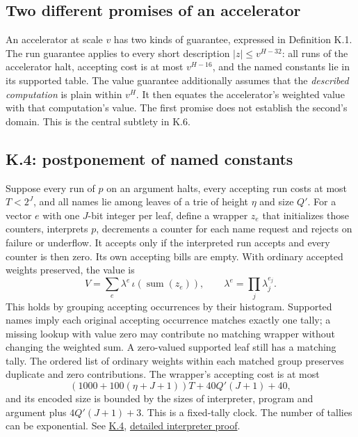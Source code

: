 \documentclass[11pt,letterpaper]{article}
\theoremstyle{definition}\newtheorem{definition}[theorem]{Definition}\newtheorem{example}[theorem]{Example}
\theoremstyle{remark}\newtheorem{remark}[theorem]{Remark}
\newcommand{\pub}[3]{\href{https://github.com/anthropics/formal-math/blob/11b6c7e3c927df2658f513b6b68ea7f8929c62c5/vp-vnp/#1\#L#2}{#3}}
\newcommand{\aud}[2]{\href{https://github.com/nousentllc/VP-VNP-Review/blob/567303d0bcf4f9d54390437b137752446e58ccd6/#1}{#2}}
\begin{document}
\subsection{Two different promises of an accelerator}
An accelerator at scale $v$ has two kinds of guarantee, expressed in Definition K.1. The run guarantee applies to every short description $|z|\le v^{H-32}$: all runs of the accelerator halt, accepting cost is at most $v^{H-16}$, and the named constants lie in its supported table. The value guarantee additionally assumes that the \emph{described computation} is plain within $v^H$. It then equates the accelerator's weighted value with that computation's value. The first promise does not establish the second's domain. This is the central subtlety in K.6.

\subsection{K.4: postponement of named constants}\label{sec:postpone}
Suppose every run of $p$ on an argument halts, every accepting run costs at most $T<2^J$, and all names lie among leaves of a trie of height $\eta$ and size $Q'$. For a vector $e$ with one $J$-bit integer per leaf, define a wrapper $z_e$ that initializes those counters, interprets $p$, decrements a counter for each name request and rejects on failure or underflow. It accepts only if the interpreted run accepts and every counter is then zero. Its own accepting bills are empty. With ordinary accepted weights preserved, the value is
\begin{equation}\label{eq:postpone}
 V=\sum_e \lambda^e\,\iota(\operatorname{sum}(z_e)),\qquad
 \lambda^e=\prod_j\lambda_j^{e_j}.
\end{equation}
This holds by grouping accepting occurrences by their histogram. Supported names imply each original accepting occurrence matches exactly one tally; a missing lookup with value zero may contribute no matching wrapper without changing the weighted sum. A zero-valued supported leaf still has a matching tally. The ordered list of ordinary weights within each matched group preserves duplicate and zero contributions. The wrapper's accepting cost is at most
\[
 (1000+100(\eta+J+1))T+40Q'(J+1)+40,
\]
and its encoded size is bounded by the sizes of interpreter, program and argument plus $4Q'(J+1)+3$. This is a fixed-tally clock. The number of tallies can be exponential. See \pub{Paper/Postpone.lean}{19}{K.4}, \aud{report/pass15-k4.tex}{detailed interpreter proof}.
\end{document}
